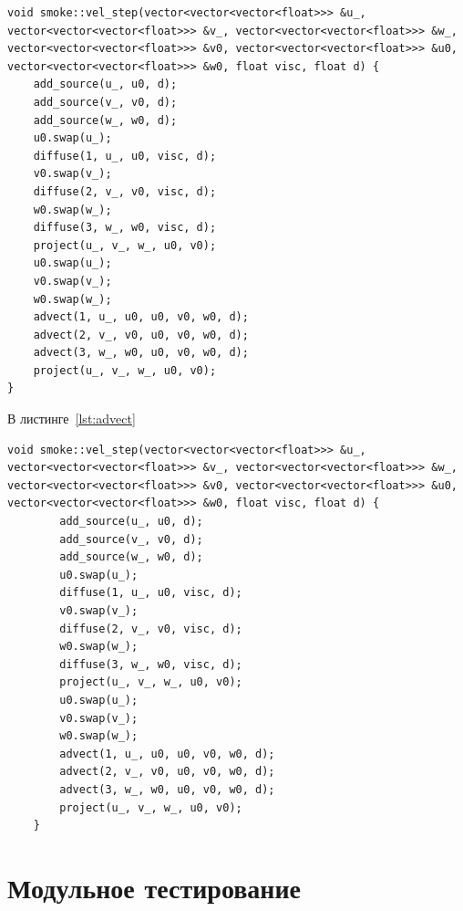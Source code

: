 \begin{lstlisting}[caption={Функция обновления поля скорости},label={lst:vel_step}]
void smoke::vel_step(vector<vector<vector<float>>> &u_, vector<vector<vector<float>>> &v_, vector<vector<vector<float>>> &w_, vector<vector<vector<float>>> &v0, vector<vector<vector<float>>> &u0, vector<vector<vector<float>>> &w0, float visc, float d) {
	add_source(u_, u0, d);
	add_source(v_, v0, d);
	add_source(w_, w0, d);
	u0.swap(u_);
	diffuse(1, u_, u0, visc, d);
	v0.swap(v_);
	diffuse(2, v_, v0, visc, d);
	w0.swap(w_);
	diffuse(3, w_, w0, visc, d);
	project(u_, v_, w_, u0, v0);
	u0.swap(u_);
	v0.swap(v_);
	w0.swap(w_);
	advect(1, u_, u0, u0, v0, w0, d);
	advect(2, v_, v0, u0, v0, w0, d);
	advect(3, w_, w0, u0, v0, w0, d);
	project(u_, v_, w_, u0, v0);
}
\end{lstlisting}

В листинге~\ref{lst:advect} 

\begin{lstlisting}[caption={Функция вычисления адвекции},label={lst:advect}]
	void smoke::vel_step(vector<vector<vector<float>>> &u_, vector<vector<vector<float>>> &v_, vector<vector<vector<float>>> &w_, vector<vector<vector<float>>> &v0, vector<vector<vector<float>>> &u0, vector<vector<vector<float>>> &w0, float visc, float d) {
		add_source(u_, u0, d);
		add_source(v_, v0, d);
		add_source(w_, w0, d);
		u0.swap(u_);
		diffuse(1, u_, u0, visc, d);
		v0.swap(v_);
		diffuse(2, v_, v0, visc, d);
		w0.swap(w_);
		diffuse(3, w_, w0, visc, d);
		project(u_, v_, w_, u0, v0);
		u0.swap(u_);
		v0.swap(v_);
		w0.swap(w_);
		advect(1, u_, u0, u0, v0, w0, d);
		advect(2, v_, v0, u0, v0, w0, d);
		advect(3, w_, w0, u0, v0, w0, d);
		project(u_, v_, w_, u0, v0);
	}
\end{lstlisting}

\section{Модульное тестирование}

